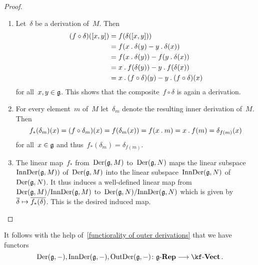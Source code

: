 \begin{proof}
  \leavevmode
  \begin{enumerate}
    \item
      Let~$\delta$ be a derivation of~$M$.
      Then
      \begin{align*}
        (f \circ \delta)([x,y])
        &=
        f( \delta([x,y]) )
        \\
        &=
        f( x \mathbin{.} \delta(y) - y \mathbin{.} \delta(x) )
        \\
        &=
        f( x \mathbin{.} \delta(y) ) - f( y \mathbin{.} \delta(x) )
        \\
        &=
        x \mathbin{.} f( \delta(y) ) - y \mathbin{.} f( \delta(x) )
        \\
        &=
        x \mathbin{.} (f \circ \delta)(y) - y \mathbin{.} (f \circ \delta)(x)
      \end{align*}
      for all~$x, y \in \mathfrak{g}$.
      This shows that the composite~$f \circ \delta$ is again a derivation.
    \item
      For every element~$m$ of~$M$ let~$\delta_m$ denote the resulting inner derivation of~$M$.
      Then
      \[
        f_*(\delta_m)(x)
        =
        (f \circ \delta_m)(x)
        =
        f( \delta_m(x) )
        =
        f( x \mathbin{.} m )
        =
        x \mathbin{.} f(m)
        =
        \delta_{f(m)}(x)
      \]
      for all~$x \in \mathfrak{g}$ and thus~$f_*( \delta_m ) = \delta_{f(m)}$.
    \item
      The linear map~$f_*$ from~$\operatorname{Der}(\mathfrak{g}, M)$ to~$\operatorname{Der}(\mathfrak{g}, N)$ maps the linear subspace~$\operatorname{InnDer}(\mathfrak{g}, M) )$ of~$\operatorname{Der}(\mathfrak{g}, M)$ into the linear subspace~$\operatorname{InnDer}(\mathfrak{g}, N)$ of~$\operatorname{Der}(\mathfrak{g}, N)$.
      It thus induces a well-defined linear map from~$\operatorname{Der}(\mathfrak{g}, M) / {\operatorname{InnDer}(\mathfrak{g}, M)}$ to~$\operatorname{Der}(\mathfrak{g}, N) / {\operatorname{InnDer}(\mathfrak{g}, N)}$ which is given by~$\class{\delta} \mapsto \class{f_*(\delta)}$.
      This is the desired induced map.
    \qedhere
  \end{enumerate}
\end{proof}


\begin{remark}
  It follows with the help of~\cref{functiorality of outer derivations} that we have functors
  \[
    \Der(\glie, -),
    \InnDer(\glie, -),
    \OutDer(\glie, -)
    \colon
    \cRep{\glie}
    \to
    \cVect{\kf} \,.
  \]
\end{remark}


